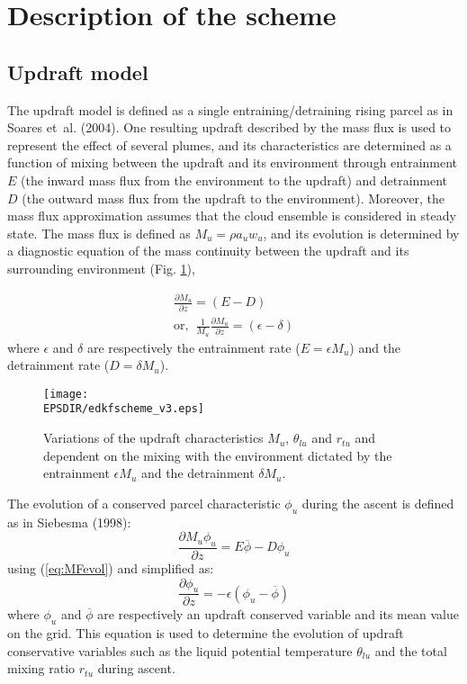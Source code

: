 \section{Description of the scheme}
\subsection{Updraft model}

The updraft model is defined as a single entraining/detraining rising parcel as in Soares et~al. (2004). One resulting updraft described by the mass flux is used to represent the effect of several plumes, and its characteristics are determined as a function of mixing between the updraft and its environment through entrainment $E$ (the inward mass flux from the environment to the updraft) and detrainment $D$ (the outward mass flux from the updraft to the environment). Moreover, the mass flux approximation assumes that the cloud ensemble is considered in steady state. The mass flux is defined as $M_u=\rho a_u w_u$, and its evolution is determined by a diagnostic equation of the mass continuity between the updraft and its surrounding environment (Fig. \ref{fig:SchemeDes}), 

\begin{eqnarray}
\frac{\partial{M_u}}{\partial{z}}=(E-D)\\
\mathrm{or,\hspace{5pt}}   \frac{1}{M_u}\frac{\partial{M_u}}{\partial{z}}=(\epsilon-\delta)
\label{eq:MFevol}
\end{eqnarray}
where $\epsilon$ and $\delta$ are respectively the entrainment rate  ($E=\epsilon M_u$) and the detrainment rate ($D=\delta M_u$).

\begin{figure} 
	\begin{center}
		\texttt{[image: \\EPSDIR/edkfscheme\_v3.eps]}
	\end{center}
	\caption{Variations of the updraft characteristics $M_u$, $\theta_{lu}$ and $r_{tu}$ and dependent on the mixing with the environment dictated by the entrainment $\epsilon M_u$ and the detrainment $\delta M_u$.}
	\label{fig:SchemeDes}
\end{figure}

The evolution of a conserved parcel characteristic $\phi_u$ during the ascent is defined as in Siebesma (1998):\\
\begin{equation}
\frac{\partial{M_u\phi_u}}{\partial{z}}=E\overline{\phi}-D\phi_u
\label{eq:Phievol1}
\end{equation}
using (\ref{eq:MFevol}) and simplified as:
\begin{equation}
\frac{\partial{\phi_u}}{\partial{z}}=-\epsilon(\phi_u-\overline{\phi})
\label{eq:Phievol2}
\end{equation}
where $\phi_u$ and $\overline{\phi}$ are respectively an updraft conserved variable and its mean value on the grid. This equation is used to determine the evolution of updraft conservative variables such as the liquid potential temperature $\theta_{lu}$ and the total mixing ratio $r_{tu}$ during ascent.

